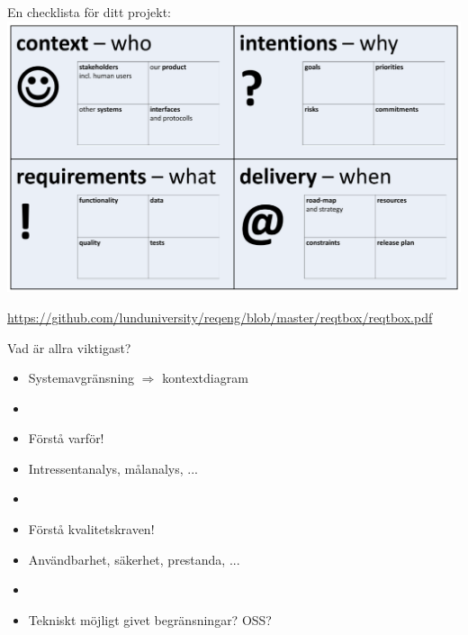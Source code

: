 \documentclass{simpleslides}
\begin{document}
\begin{Slide}{En checklista för ditt projekt:}
\hspace*{-0.55cm}\includegraphics[width=1.1\textwidth]{img/reqt-box}

{\noindent\tiny\href{https://github.com/lunduniversity/reqeng/blob/master/reqtbox/reqtbox.pdf}{https://github.com/lunduniversity/reqeng/blob/master/reqtbox/reqtbox.pdf}}
\end{Slide}

\begin{Slide}{Vad är allra viktigast?}
  \begin{itemize}\fontsize{14}{16}\selectfont
    \item Systemavgränsning \hfill $\Rightarrow$ kontextdiagram
    \item []
    \item Förstå varför! 
    \item[] Intressentanalys, målanalys, ...
    \item[] 
    \item Förstå kvalitetskraven!
    \item[] Användbarhet, säkerhet, prestanda, ...
    \item[] 
    \item Tekniskt möjligt givet begränsningar? \hfill OSS? 
  \end{itemize}
\end{Slide}


\end{document}
